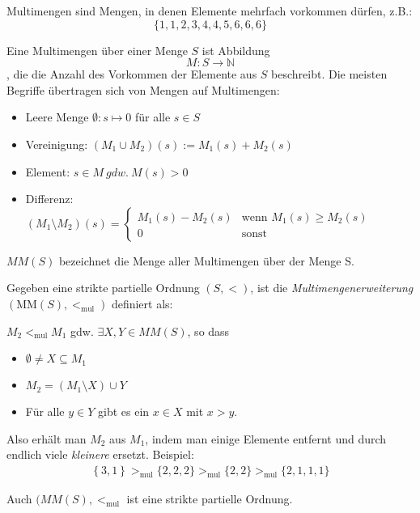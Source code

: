 Multimengen sind Mengen, in denen Elemente mehrfach vorkommen dürfen, z.B.:
$$\{1,1,2,3,4,4,5,6,6,6\}$$

Eine Multimengen über einer Menge $S$ ist Abbildung $$M:S\rightarrow\mathbb{N}$$, die die Anzahl des Vorkommen der Elemente aus $S$ beschreibt.
Die meisten Begriffe übertragen sich von Mengen auf Multimengen:

\begin{itemize}
	\item Leere Menge $\emptyset: s \mapsto 0$ für alle $s \in S$
	\item Vereinigung: $(M_1 \cup M_2)(s) := M_1(s) + M_2(s)$ 
	\item Element: $s \in M\ gdw.\ M(s)>0$
    \item Differenz: $(M_1 \setminus M_2)(s) =
        \begin{cases}
                M_1(s) - M_2(s) & \text{wenn } M_1(s) \geq M_2(s)\\
                0 & \text{sonst}
        \end{cases}$
\end{itemize}

$MM(S)$ bezeichnet die Menge aller Multimengen über der Menge S.

Gegeben eine strikte partielle Ordnung $\left( S, < \right)$, ist die
\emph{Multimengenerweiterung} $\left( \text{MM}\left( S \right), <_{\text{mul}} \right)$ definiert als: 

$M_2 <_{\text{mul}}M_1$ gdw. $\exists X,Y \in MM(S)$, so dass

\begin{itemize}
\item
  $\emptyset \neq X \subseteq M_1$
\item
  $M_2 = \left( M_1 \setminus X \right) \cup Y$
\item
    Für alle $y \in Y$ gibt es ein $x \in X$ mit $x > y$.
\end{itemize}

Also erhält man $M_2$ aus $M_1$, indem man einige Elemente entfernt und durch endlich viele \emph{kleinere} ersetzt.
Beispiel:
\begin{align*}
\left\{ 3,1 \right\} >_{\text{mul}}\{ 2,2,2\} >_{\text{mul}}\{ 2,2\} >_{\text{mul}}\{ 2,1,1,1\}
\end{align*}

\setcounter{definition}{5}
\begin{lemma}
    Auch $(MM(S), <_{\text{mul}}$ ist eine strikte partielle Ordnung.
\end{lemma}

